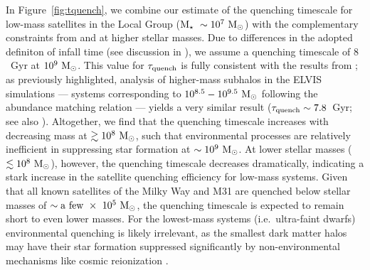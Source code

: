 \documentclass[usenatbib]{mn2e}
\newcommand{\mstar}{{\rm M}_{\star}}
\newcommand{\msun}{{\rm M}_{\odot}}
\begin{document}
In Figure~\ref{fig:tquench}, we combine our estimate of the quenching
timescale for low-mass satellites in the Local Group ($\mstar~\sim
10^{7}~\msun$) with the complementary constraints from
\citet{wheeler14} and \citet{wetzel13} at higher stellar masses. Due
to differences in the adopted definiton of infall time (see discussion
in \citealt{wheeler14}), we assume a quenching timescale of $8$~Gyr at
$10^{9}~\msun$. This value for $\tau_{\rm quench}$ is fully consistent
with the results from \citet[][$\tau_{\rm
  quench}\sim7.5-9$~Gyr]{wheeler14}; as previously highlighted,
analysis of higher-mass subhalos in the ELVIS simulations --- systems
corresponding to $10^{8.5}-10^{9.5}~\msun$ following the \citet{gk14}
abundance matching relation --- yields a very similar result
($\tau_{\rm quench}\sim7.8$~Gyr; see also
\citealt{delucia12}). Altogether, we find that the quenching timescale
increases with decreasing mass at $\gtrsim10^{8}~\msun$, such that
environmental processes are relatively inefficient in suppressing star
formation at $\sim10^{9}~\msun$. At lower stellar masses
($\lesssim10^{8}~\msun$), however, the quenching timescale decreases
dramatically, indicating a stark increase in the satellite quenching
efficiency for low-mass systems. Given that all known satellites of
the Milky Way and M31 are quenched below stellar masses of $\sim{\rm
  a~few}~\times~10^{5}~\msun$, the quenching timescale is expected to
remain short to even lower masses.  For the lowest-mass systems
(i.e.~ultra-faint dwarfs) environmental quenching is likely
irrelevant, as the smallest dark matter halos may have their star
formation suppressed significantly by non-environmental mechanisms
like cosmic reionization \citep[e.g.][]{rees86, efstathiou92,
  wyithe06, onorbe15}.
\end{document}
